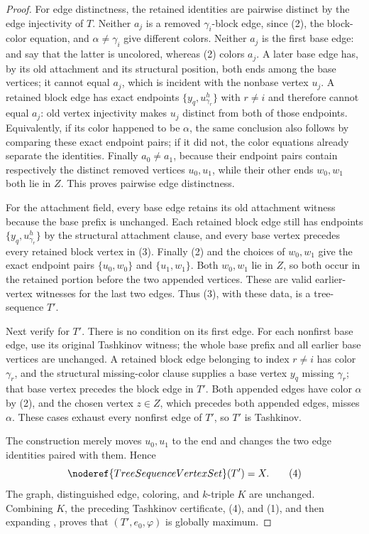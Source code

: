 \begin{proof}
For edge distinctness, the retained identities are pairwise distinct by
the edge injectivity of $T$.  Neither $a_j$ is a removed
$\gamma_i$-block edge, since (2), the block-color equation, and
$\alpha\ne\gamma_i$ give different colors.  Neither $a_j$ is the first
base edge:  and
 say that the latter is uncolored, whereas
(2) colors $a_j$.  A later base edge has, by its old
 attachment and its structural position, both
ends among the base vertices; it cannot equal $a_j$, which is incident
with the nonbase vertex $u_j$.  A retained block edge has exact endpoints
$\{y_q,u^h_{\gamma_r}\}$ with $r\ne i$ and therefore cannot equal
$a_j$: old vertex injectivity makes $u_j$ distinct from both of those
endpoints.  Equivalently, if its color happened to be $\alpha$, the same
conclusion also follows by comparing these exact endpoint pairs; if it did
not, the color equations already separate the identities.  Finally
$a_0\ne a_1$, because their endpoint pairs contain respectively the
distinct removed vertices $u_0,u_1$, while their other ends $w_0,w_1$
both lie in $Z$.  This proves pairwise edge distinctness.

For the attachment field, every base edge retains its old attachment
witness because the base prefix is unchanged.  Each retained block edge
still has endpoints $\{y_q,u^h_{\gamma_r}\}$ by the structural
attachment clause, and every base vertex precedes every retained block
vertex in (3).  Finally (2) and the choices of $w_0,w_1$ give the exact
endpoint pairs $\{u_0,w_0\}$ and $\{u_1,w_1\}$.  Both $w_0,w_1$ lie in
$Z$, so both occur in the retained portion before the two appended
vertices.  These are valid earlier-vertex witnesses for the last two
edges.  Thus (3), with these data, is a tree-sequence $T'$.

Next verify  for $T'$.  There is no condition on
its first edge.  For each nonfirst base edge, use its original Tashkinov
witness; the whole base prefix and all earlier base vertices are
unchanged.  A retained block edge belonging to index $r\ne i$ has color
$\gamma_r$, and the structural missing-color clause supplies a base
vertex $y_q$ missing $\gamma_r$; that base vertex precedes the block edge
in $T'$.  Both appended edges have color $\alpha$ by (2), and the chosen
vertex $z\in Z$, which precedes both appended edges, misses $\alpha$.
These cases exhaust every nonfirst edge of $T'$, so $T'$ is Tashkinov.

The construction merely moves $u_0,u_1$ to the end and changes the two
edge identities paired with them.  Hence
\[
 \noderef{TreeSequenceVertexSet}(T')=X.                       \tag{4}
\]
The graph, distinguished edge, coloring, and $k$-triple $K$ are
unchanged.  Combining $K$, the preceding Tashkinov certificate, (4), and
(1), and then expanding , proves that
$(T',e_0,\varphi)$ is globally maximum.


\end{proof}
